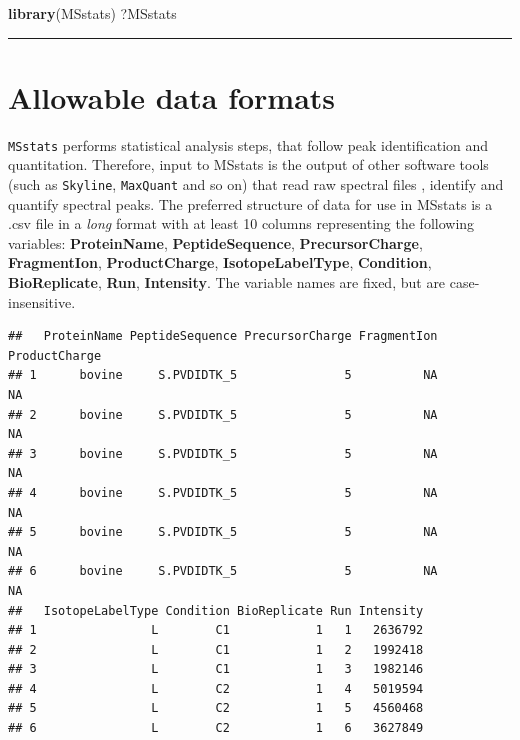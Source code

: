 \documentclass[]{book}
\newenvironment{Shaded}{\begin{snugshade}}{\end{snugshade}}
\newcommand{\KeywordTok}[1]{\textcolor[rgb]{0.13,0.29,0.53}{\textbf{#1}}}
\newcommand{\NormalTok}[1]{#1}
\begin{document}
\begin{Shaded}
\begin{Highlighting}[]
\KeywordTok{library}\NormalTok{(MSstats)}
\NormalTok{?MSstats}
\end{Highlighting}
\end{Shaded}

\begin{center}\rule{0.5\linewidth}{\linethickness}\end{center}

\hypertarget{allowable-data-formats}{%
\section{Allowable data formats}\label{allowable-data-formats}}

\texttt{MSstats} performs statistical analysis steps, that follow peak identification and quantitation. Therefore, input
to MSstats is the output of other software tools (such as \texttt{Skyline}, \texttt{MaxQuant} and so on) that read raw spectral files
, identify and quantify spectral peaks. The preferred structure of data for use in MSstats is a .csv file
in a \emph{long} format with at least 10 columns representing the following variables: \textbf{ProteinName}, \textbf{PeptideSequence}, \textbf{PrecursorCharge}, \textbf{FragmentIon}, \textbf{ProductCharge}, \textbf{IsotopeLabelType}, \textbf{Condition}, \textbf{BioReplicate}, \textbf{Run}, \textbf{Intensity}. The variable names are fixed, but are case-insensitive.

\begin{verbatim}
##   ProteinName PeptideSequence PrecursorCharge FragmentIon ProductCharge
## 1      bovine     S.PVDIDTK_5               5          NA            NA
## 2      bovine     S.PVDIDTK_5               5          NA            NA
## 3      bovine     S.PVDIDTK_5               5          NA            NA
## 4      bovine     S.PVDIDTK_5               5          NA            NA
## 5      bovine     S.PVDIDTK_5               5          NA            NA
## 6      bovine     S.PVDIDTK_5               5          NA            NA
##   IsotopeLabelType Condition BioReplicate Run Intensity
## 1                L        C1            1   1   2636792
## 2                L        C1            1   2   1992418
## 3                L        C1            1   3   1982146
## 4                L        C2            1   4   5019594
## 5                L        C2            1   5   4560468
## 6                L        C2            1   6   3627849
\end{verbatim}
\end{document}
